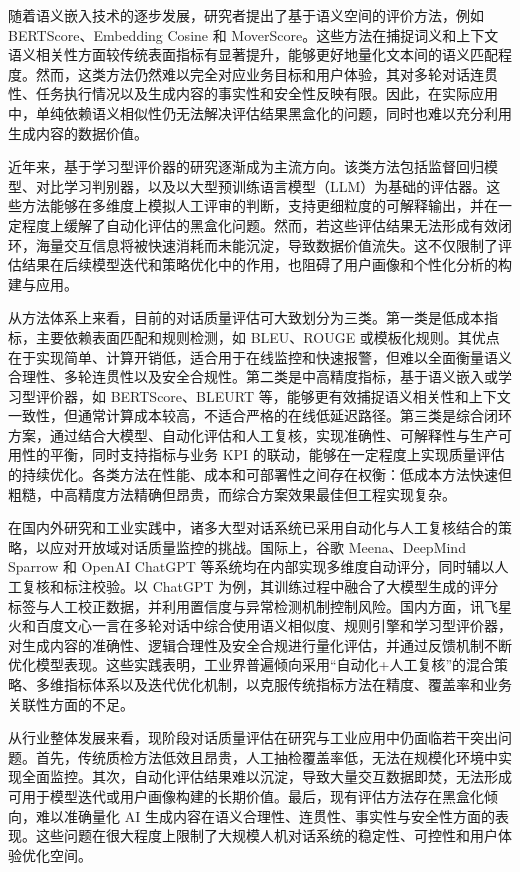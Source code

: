 随着语义嵌入技术的逐步发展，研究者提出了基于语义空间的评价方法，例如 BERTScore、Embedding Cosine 和 MoverScore。这些方法在捕捉词义和上下文语义相关性方面较传统表面指标有显著提升，能够更好地量化文本间的语义匹配程度。然而，这类方法仍然难以完全对应业务目标和用户体验，其对多轮对话连贯性、任务执行情况以及生成内容的事实性和安全性反映有限。因此，在实际应用中，单纯依赖语义相似性仍无法解决评估结果黑盒化的问题，同时也难以充分利用生成内容的数据价值。

近年来，基于学习型评价器的研究逐渐成为主流方向。该类方法包括监督回归模型、对比学习判别器\cite{gao-etal-2021-simcse}，以及以大型预训练语言模型（LLM）为基础的评估器\cite{liu-etal-2023-g}。这些方法能够在多维度上模拟人工评审的判断，支持更细粒度的可解释输出，并在一定程度上缓解了自动化评估的黑盒化问题。然而，若这些评估结果无法形成有效闭环，海量交互信息将被快速消耗而未能沉淀，导致数据价值流失。这不仅限制了评估结果在后续模型迭代和策略优化中的作用，也阻碍了用户画像和个性化分析的构建与应用。

从方法体系上来看，目前的对话质量评估可大致划分为三类。第一类是低成本指标，主要依赖表面匹配和规则检测，如 BLEU、ROUGE 或模板化规则。其优点在于实现简单、计算开销低，适合用于在线监控和快速报警，但难以全面衡量语义合理性、多轮连贯性以及安全合规性。第二类是中高精度指标，基于语义嵌入或学习型评价器，如 BERTScore、BLEURT 等\cite{sellam-etal-2020-bleurt}，能够更有效捕捉语义相关性和上下文一致性，但通常计算成本较高，不适合严格的在线低延迟路径。第三类是综合闭环方案，通过结合大模型、自动化评估和人工复核，实现准确性、可解释性与生产可用性的平衡，同时支持指标与业务 KPI 的联动，能够在一定程度上实现质量评估的持续优化。各类方法在性能、成本和可部署性之间存在权衡：低成本方法快速但粗糙，中高精度方法精确但昂贵，而综合方案效果最佳但工程实现复杂。

在国内外研究和工业实践中，诸多大型对话系统已采用自动化与人工复核结合的策略，以应对开放域对话质量监控的挑战。国际上，谷歌 Meena、DeepMind Sparrow 和 OpenAI ChatGPT 等系统均在内部实现多维度自动评分，同时辅以人工复核和标注校验。以 ChatGPT 为例，其训练过程中融合了大模型生成的评分标签与人工校正数据，并利用置信度与异常检测机制控制风险。国内方面，讯飞星火和百度文心一言在多轮对话中综合使用语义相似度、规则引擎和学习型评价器，对生成内容的准确性、逻辑合理性及安全合规进行量化评估，并通过反馈机制不断优化模型表现。这些实践表明，工业界普遍倾向采用“自动化+人工复核”的混合策略、多维指标体系以及迭代优化机制，以克服传统指标方法在精度、覆盖率和业务关联性方面的不足。

从行业整体发展来看，现阶段对话质量评估在研究与工业应用中仍面临若干突出问题。首先，传统质检方法低效且昂贵，人工抽检覆盖率低，无法在规模化环境中实现全面监控。其次，自动化评估结果难以沉淀，导致大量交互数据即焚，无法形成可用于模型迭代或用户画像构建的长期价值。最后，现有评估方法存在黑盒化倾向，难以准确量化 AI 生成内容在语义合理性、连贯性、事实性与安全性方面的表现\cite{10.1145/3571730}。这些问题在很大程度上限制了大规模人机对话系统的稳定性、可控性和用户体验优化空间。
